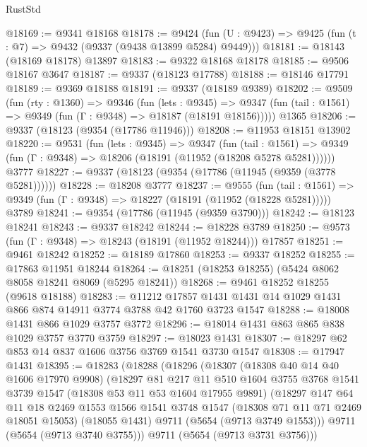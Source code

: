 \begin{lexlean}{RustStd}
\begin{coremodule}
@18169 := @9341 @18168
@18178 := @9424
    (fun (U : @9423) => @9425 (fun (t : @7) => @9432 (@9337 (@9438 @13899 @5284) @9449)))
@18181 := @18143 (@18169 @18178) @13897
@18183 := @9322 @18168 @18178
@18185 := @9506 @18167 @3647
@18187 := @9337 (@18123 @17788)
@18188 := @18146 @17791
@18189 := @9369 @18188
@18191 := @9337 (@18189 @9389)
@18202 := @9509
    (fun (rty : @1360) =>
    @9346
      (fun (lets : @9345) =>
      @9347 (fun (tail : @1561) => @9349 (fun (Γ : @9348) => @18187 (@18191 @18156)))))
    @1365
@18206 := @9337 (@18123 (@9354 (@17786 @11946)))
@18208 := @11953 @18151 @13902
@18220 := @9531
    (fun (lets : @9345) =>
    @9347
      (fun (tail : @1561) =>
      @9349 (fun (Γ : @9348) => @18206 (@18191 (@11952 (@18208 @5278 @5281))))))
    @3777
@18227 := @9337 (@18123 (@9354 (@17786 (@11945 (@9359 (@3778 @5281))))))
@18228 := @18208 @3777
@18237 := @9555
    (fun (tail : @1561) => @9349 (fun (Γ : @9348) => @18227 (@18191 (@11952 (@18228 @5281)))))
    @3789
@18241 := @9354 (@17786 (@11945 (@9359 @3790)))
@18242 := @18123 @18241
@18243 := @9337 @18242
@18244 := @18228 @3789
@18250 := @9573 (fun (Γ : @9348) => @18243 (@18191 (@11952 @18244))) @17857
@18251 := @9461 @18242
@18252 := @18189 @17860
@18253 := @9337 @18252
@18255 := @17863 @11951 @18244
@18264 := @18251 (@18253 @18255) (@5424 @8062 @8058 @18241 @8069 (@5295 @18241))
@18268 := @9461 @18252 @18255 (@9618 @18188)
@18283 := @11212
    @17857
    @1431
    @1431
    @14
    @1029
    @1431
    @866
    @874
    @14911
    @3774
    @3788
    @42
    @1760
    @3723
    @1547
@18288 := @18008 @1431 @866 @1029 @3757 @3772
@18296 := @18014 @1431 @863 @865 @838 @1029 @3757 @3770 @3759
@18297 := @18023 @1431
@18307 := @18297 @62 @853 @14 @837 @1606 @3756 @3769 @1541 @3730 @1547
@18308 := @17947 @1431
@18395 := @18283
    (@18288
      (@18296
        (@18307
          (@18308 @40 @14 @40 @1606 @17970 @9908)
          (@18297
            @81
            @217
            @11
            @510
            @1604
            @3755
            @3768
            @1541
            @3739
            @1547
            (@18308 @53 @11 @53 @1604 @17955 @9891)
            (@18297
              @147
              @64
              @11
              @18
              @2469
              @1553
              @1566
              @1541
              @3748
              @1547
              (@18308 @71 @11 @71 @2469 @18051 @15053)
              (@18055 @1431)
              @9711
              (@5654 (@9713 @3749 @1553)))
            @9711
            (@5654 (@9713 @3740 @3755)))
          @9711
          (@5654 (@9713 @3731 @3756)))

\end{coremodule}
\end{lexlean}

